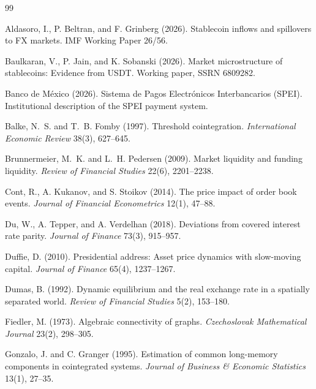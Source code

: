 \documentclass[12pt]{article}
\theoremstyle{definition}
\theoremstyle{remark}
\begin{document}
\clearpage
\singlespacing
\begin{thebibliography}{99}
\setlength{\itemsep}{2pt}

Aldasoro, I., P. Beltran, and F. Grinberg (2026). Stablecoin inflows and spillovers to FX markets. IMF Working Paper 26/56.

Baulkaran, V., P. Jain, and K. Sobanski (2026). Market microstructure of stablecoins: Evidence from USDT. Working paper, SSRN 6809282.

Banco de M\'exico (2026). Sistema de Pagos Electr\'onicos Interbancarios (SPEI). Institutional description of the SPEI payment system.

Balke, N.~S. and T.~B. Fomby (1997). Threshold cointegration. \emph{International Economic Review} 38(3), 627--645.

Brunnermeier, M.~K. and L.~H. Pedersen (2009). Market liquidity and funding liquidity. \emph{Review of Financial Studies} 22(6), 2201--2238.

Cont, R., A. Kukanov, and S. Stoikov (2014). The price impact of order book events. \emph{Journal of Financial Econometrics} 12(1), 47--88.

Du, W., A. Tepper, and A. Verdelhan (2018). Deviations from covered interest rate parity. \emph{Journal of Finance} 73(3), 915--957.

Duffie, D. (2010). Presidential address: Asset price dynamics with slow-moving capital. \emph{Journal of Finance} 65(4), 1237--1267.

Dumas, B. (1992). Dynamic equilibrium and the real exchange rate in a spatially separated world. \emph{Review of Financial Studies} 5(2), 153--180.

Fiedler, M. (1973). Algebraic connectivity of graphs. \emph{Czechoslovak Mathematical Journal} 23(2), 298--305.

Gonzalo, J. and C. Granger (1995). Estimation of common long-memory components in cointegrated systems. \emph{Journal of Business \& Economic Statistics} 13(1), 27--35.


\end{thebibliography}
\end{document}
